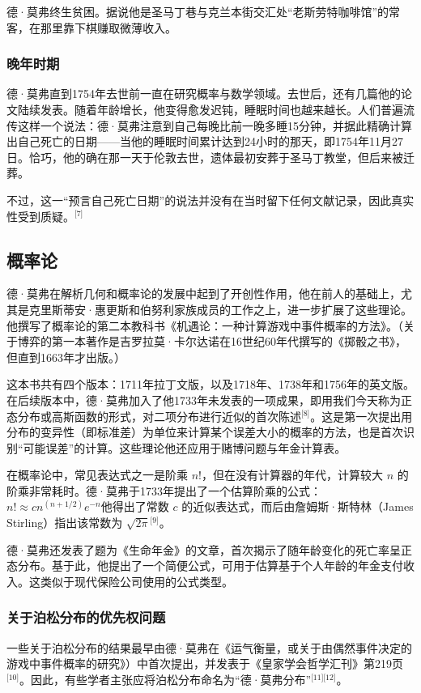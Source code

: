 德·莫弗终生贫困。据说他是圣马丁巷与克兰本街交汇处“老斯劳特咖啡馆”的常客，在那里靠下棋赚取微薄收入。
\subsubsection{晚年时期}
德·莫弗直到1754年去世前一直在研究概率与数学领域。去世后，还有几篇他的论文陆续发表。随着年龄增长，他变得愈发迟钝，睡眠时间也越来越长。人们普遍流传这样一个说法：德·莫弗注意到自己每晚比前一晚多睡15分钟，并据此精确计算出自己死亡的日期——当他的睡眠时间累计达到24小时的那天，即1754年11月27日。恰巧，他的确在那一天于伦敦去世，遗体最初安葬于圣马丁教堂，但后来被迁葬。

不过，这一“预言自己死亡日期”的说法并没有在当时留下任何文献记录，因此真实性受到质疑。\(^\text{[7]}\)
\subsection{概率论}
德·莫弗在解析几何和概率论的发展中起到了开创性作用，他在前人的基础上，尤其是克里斯蒂安·惠更斯和伯努利家族成员的工作之上，进一步扩展了这些理论。他撰写了概率论的第二本教科书《机遇论：一种计算游戏中事件概率的方法》。（关于博弈的第一本著作是吉罗拉莫·卡尔达诺在16世纪60年代撰写的《掷骰之书》，但直到1663年才出版。）

这本书共有四个版本：1711年拉丁文版，以及1718年、1738年和1756年的英文版。在后续版本中，德·莫弗加入了他1733年未发表的一项成果，即用我们今天称为正态分布或高斯函数的形式，对二项分布进行近似的首次陈述\(^\text{[8]}\)。这是第一次提出用分布的变异性（即标准差）为单位来计算某个误差大小的概率的方法，也是首次识别“可能误差”的计算。这些理论他还应用于赌博问题与年金计算表。

在概率论中，常见表达式之一是阶乘 $n!$，但在没有计算器的年代，计算较大 $n$ 的阶乘非常耗时。德·莫弗于1733年提出了一个估算阶乘的公式：$n! \approx cn^{(n + 1/2)} e^{-n}$他得出了常数 $c$ 的近似表达式，而后由詹姆斯·斯特林（James Stirling）指出该常数为 $\sqrt{2\pi}$\(^\text{[9]}\)。

德·莫弗还发表了题为《生命年金》的文章，首次揭示了随年龄变化的死亡率呈正态分布。基于此，他提出了一个简便公式，可用于估算基于个人年龄的年金支付收入。这类似于现代保险公司使用的公式类型。
\subsubsection{关于泊松分布的优先权问题}
一些关于泊松分布的结果最早由德·莫弗在《运气衡量，或关于由偶然事件决定的游戏中事件概率的研究》）中首次提出，并发表于《皇家学会哲学汇刊》第219页\(^\text{[10]}\)。因此，有些学者主张应将泊松分布命名为“德·莫弗分布”\(^\text{[11][12]}\)。
